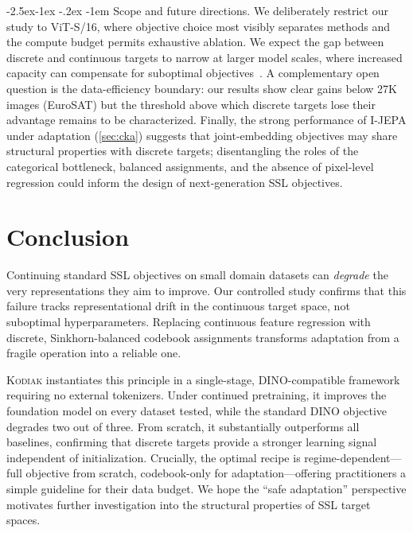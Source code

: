 \documentclass[runningheads]{llncs}
\makeatletter
\newcommand{\method}{\textsc{Kodiak}}
\renewcommand\paragraph{\@startsection{paragraph}{4}{\z@}%
  {-2.5ex\@plus -1ex \@minus -.2ex}%
  {-1em}%
  {\normalfont\normalsize\bfseries}}
\makeatother
\begin{document}
\paragraph{Scope and future directions.}
We deliberately restrict our study to ViT-S/16, where objective choice most visibly separates methods and the compute budget permits exhaustive ablation.
We expect the gap between discrete and continuous targets to narrow at larger model scales, where increased capacity can compensate for suboptimal objectives~\cite{he2022masked}.
A complementary open question is the data-efficiency boundary: our results show clear gains below 27K images (EuroSAT) but the threshold above which discrete targets lose their advantage remains to be characterized.
Finally, the strong performance of I-JEPA under adaptation (\cref{sec:cka}) suggests that joint-embedding objectives may share structural properties with discrete targets; disentangling the roles of the categorical bottleneck, balanced assignments, and the absence of pixel-level regression could inform the design of next-generation SSL objectives.


\section{Conclusion}
\label{sec:conclusion}

Continuing standard SSL objectives on small domain datasets can \emph{degrade} the very representations they aim to improve.
Our controlled study confirms that this failure tracks representational drift in the continuous target space, not suboptimal hyperparameters.
Replacing continuous feature regression with discrete, Sinkhorn-balanced codebook assignments transforms adaptation from a fragile operation into a reliable one.

\method{} instantiates this principle in a single-stage, DINO-compatible framework requiring no external tokenizers.
Under continued pretraining, it improves the foundation model on every dataset tested, while the standard DINO objective degrades two out of three.
From scratch, it substantially outperforms all baselines, confirming that discrete targets provide a stronger learning signal independent of initialization.
Crucially, the optimal recipe is regime-dependent---full objective from scratch, codebook-only for adaptation---offering practitioners a simple guideline for their data budget.
We hope the ``safe adaptation'' perspective motivates further investigation into the structural properties of SSL target spaces.
\end{document}
